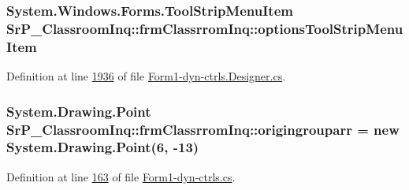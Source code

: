 \hypertarget{class_sr_p___classroom_inq_1_1frm_classrrom_inq_acdc1111ba8acc3bb1ee140845f069521}{
\subsubsection[{options\-Tool\-Strip\-Menu\-Item}]{\setlength{\rightskip}{0pt plus 5cm}\-System.\-Windows.\-Forms.\-Tool\-Strip\-Menu\-Item {\bf \-Sr\-P\-\_\-\-Classroom\-Inq\-::frm\-Classrrom\-Inq\-::options\-Tool\-Strip\-Menu\-Item}}}
\label{class_sr_p___classroom_inq_1_1frm_classrrom_inq_acdc1111ba8acc3bb1ee140845f069521}


\-Definition at line \hyperlink{_form1-dyn-ctrls_8_designer_8cs_source_l01936}{1936} of file \hyperlink{_form1-dyn-ctrls_8_designer_8cs_source}{\-Form1-\/dyn-\/ctrls.\-Designer.\-cs}.

\hypertarget{class_sr_p___classroom_inq_1_1frm_classrrom_inq_ace01ba3289e75624d67b90f742c195f5}{
\subsubsection[{origingrouparr}]{\setlength{\rightskip}{0pt plus 5cm}\-System.\-Drawing.\-Point {\bf \-Sr\-P\-\_\-\-Classroom\-Inq\-::frm\-Classrrom\-Inq\-::origingrouparr} = new \-System.\-Drawing.\-Point(6, -\/13)}}
\label{class_sr_p___classroom_inq_1_1frm_classrrom_inq_ace01ba3289e75624d67b90f742c195f5}


\-Definition at line \hyperlink{_form1-dyn-ctrls_8cs_source_l00163}{163} of file \hyperlink{_form1-dyn-ctrls_8cs_source}{\-Form1-\/dyn-\/ctrls.\-cs}.

